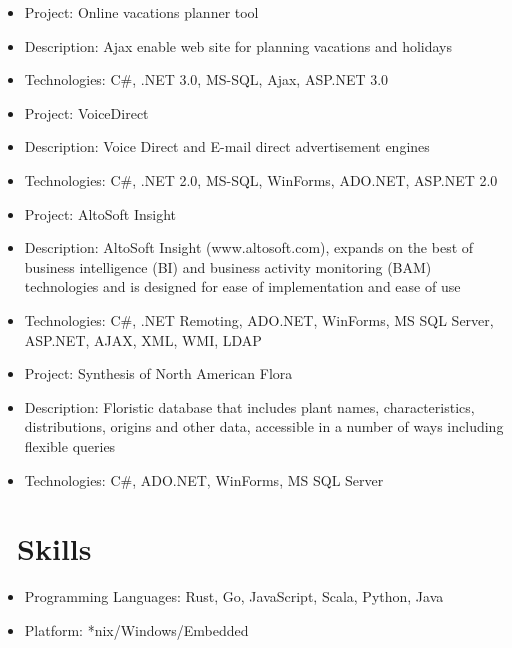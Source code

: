 \documentclass{resume}
\begin{document}
\begin{itemize}
  \item Project: Online vacations planner tool
  \item Description: Ajax enable web site for planning vacations and holidays 
  \item Technologies: C#, .NET 3.0, MS-SQL, Ajax, ASP.NET 3.0
\end{itemize}



\begin{itemize}
  \item Project: VoiceDirect 
  \item Description: Voice Direct and E-mail direct advertisement engines
  \item Technologies: C#, .NET 2.0, MS-SQL, WinForms, ADO.NET, ASP.NET 2.0
\end{itemize}



\begin{itemize}
  \item Project: AltoSoft Insight
  \item Description: AltoSoft Insight (www.altosoft.com), expands on the best of business intelligence (BI) and business activity monitoring (BAM) technologies and is designed for ease of implementation and ease of use
  \item Technologies: C#, .NET Remoting, ADO.NET, WinForms, MS SQL Server, ASP.NET, AJAX, XML, WMI, LDAP
\end{itemize}


\begin{itemize}
  \item Project: Synthesis of North American Flora 
  \item Description: Floristic database that includes plant names, characteristics, distributions, origins and other data, accessible in a number of ways including flexible queries
  \item Technologies: C#, ADO.NET, WinForms, MS SQL Server
\end{itemize}

\section{\faCogs\ Skills}
\begin{itemize}[parsep=0.5ex]
  \item Programming Languages: Rust, Go, JavaScript, Scala, Python, Java
  \item Platform: *nix/Windows/Embedded
\end{itemize}
\end{document}

